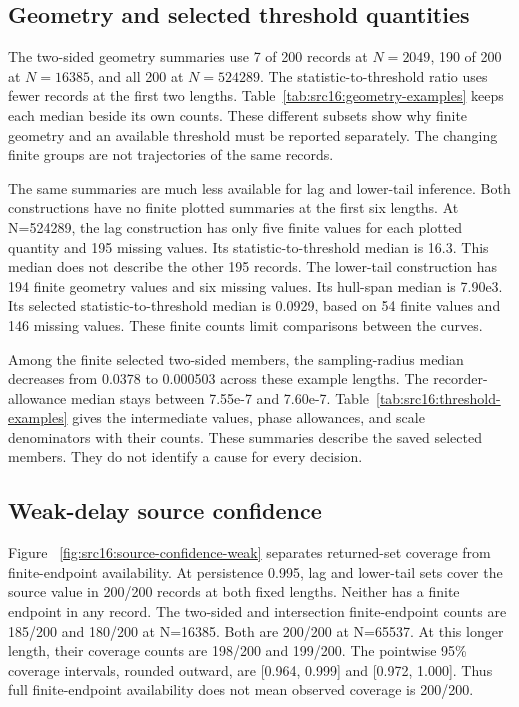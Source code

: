 \subsection{Geometry and selected threshold quantities}\label{sec:src16:diagnostic-geometry}

The two-sided geometry summaries use 7 of 200 records at $N=2049$, 190 of 200 at $N=16385$, and all 200 at $N=524289$. The statistic-to-threshold ratio uses fewer records at the first two lengths. Table~\ref{tab:src16:geometry-examples} keeps each median beside its own counts. These different subsets show why finite geometry and an available threshold must be reported separately. The changing finite groups are not trajectories of the same records.



The same summaries are much less available for lag and lower-tail inference. Both constructions have no finite plotted summaries at the first six lengths. At N=524289, the lag construction has only five finite values for each plotted quantity and 195 missing values. Its statistic-to-threshold median is 16.3. This median does not describe the other 195 records. The lower-tail construction has 194 finite geometry values and six missing values. Its hull-span median is 7.90e3. Its selected statistic-to-threshold median is 0.0929, based on 54 finite values and 146 missing values. These finite counts limit comparisons between the curves.

Among the finite selected two-sided members, the sampling-radius median decreases from 0.0378 to 0.000503 across these example lengths. The recorder-allowance median stays between 7.55e-7 and 7.60e-7. Table~\ref{tab:src16:threshold-examples} gives the intermediate values, phase allowances, and scale denominators with their counts. These summaries describe the saved selected members. They do not identify a cause for every decision.



\subsection{Weak-delay source confidence}\label{sec:src16:weak-confidence}

Figure ~\ref{fig:src16:source-confidence-weak} separates returned-set coverage from finite-endpoint availability. At persistence 0.995, lag and lower-tail sets cover the source value in 200/200 records at both fixed lengths. Neither has a finite endpoint in any record. The two-sided and intersection finite-endpoint counts are 185/200 and 180/200 at N=16385. Both are 200/200 at N=65537. At this longer length, their coverage counts are 198/200 and 199/200. The pointwise 95\% coverage intervals, rounded outward, are [0.964, 0.999] and [0.972, 1.000]. Thus full finite-endpoint availability does not mean observed coverage is 200/200.

